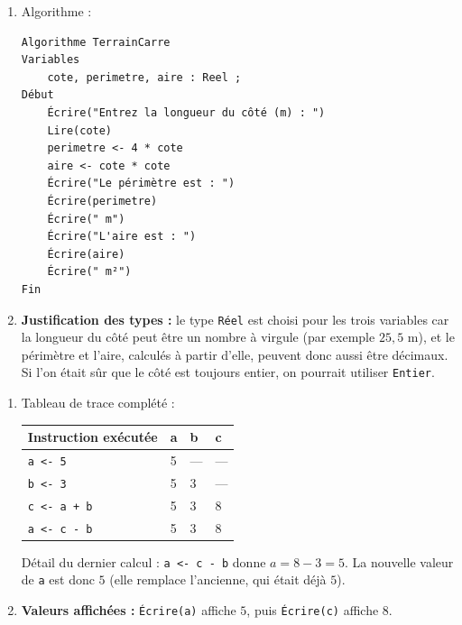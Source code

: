\documentclass[11pt]{article}
\begin{document}
\begin{corrige}
\begin{enumerate}
\item Algorithme :
\begin{lstlisting}
Algorithme TerrainCarre
Variables
    cote, perimetre, aire : Reel ;
Début
    Écrire("Entrez la longueur du côté (m) : ")
    Lire(cote)
    perimetre <- 4 * cote
    aire <- cote * cote
    Écrire("Le périmètre est : ")
    Écrire(perimetre)
    Écrire(" m")
    Écrire("L'aire est : ")
    Écrire(aire)
    Écrire(" m²")
Fin
\end{lstlisting}
\item \textbf{Justification des types :} le type \texttt{Réel} est choisi pour les trois variables car la longueur du côté peut être un nombre à virgule (par exemple $25,5$ m), et le périmètre et l'aire, calculés à partir d'elle, peuvent donc aussi être décimaux. Si l'on était sûr que le côté est toujours entier, on pourrait utiliser \texttt{Entier}.
\end{enumerate}
\end{corrige}

\begin{corrige}
\begin{enumerate}
\item Tableau de trace complété :
\begin{center}
\begin{tabularx}{\linewidth}{|l|X|X|X|}
\hline
\rowcolor{popblueL} \textbf{Instruction exécutée} & \textbf{a} & \textbf{b} & \textbf{c} \\
\hline
\texttt{a <- 5} & 5 & --- & --- \\
\hline
\texttt{b <- 3} & 5 & 3 & --- \\
\hline
\texttt{c <- a + b} & 5 & 3 & 8 \\
\hline
\texttt{a <- c - b} & 5 & 3 & 8 \\
\hline
\end{tabularx}
\end{center}
Détail du dernier calcul : \texttt{a <- c - b} donne $a = 8 - 3 = 5$. La nouvelle valeur de \texttt{a} est donc $5$ (elle remplace l'ancienne, qui était déjà $5$).
\item \textbf{Valeurs affichées :} \texttt{Écrire(a)} affiche $5$, puis \texttt{Écrire(c)} affiche $8$.
\end{enumerate}
\end{corrige}
\end{document}
